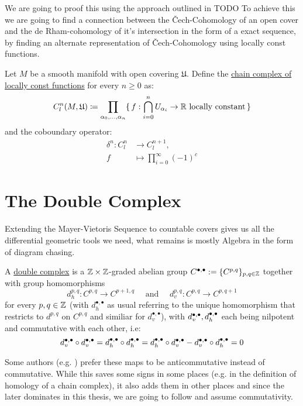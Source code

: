 We are going to proof this using the approach outlined in TODO
To achieve this we are going to find a connection between the Čech-Cohomology
of an open cover and the de Rham-cohomology of it's intersection in the form
of a exact sequence, by finding an alternate representation of Čech-Cohomology
using locally const functions.
\begin{definition}
Let $M$ be a smooth manifold with open covering $\mathfrak{U}$. Define
the \underline{chain complex of locally const functions} for every $n \geq 0$
as:
\[
	C^n_l(M, \mathfrak{U}) 
		\coloneq \prod_{\alpha_0, \dots, \alpha_n}
		\{\, f: \bigcap_{i = 0}^n U_{\alpha_i} \to \mathbb{R} \  \text{locally constant} \,\}
\]
and the coboundary operator:
\begin{align}
	\delta^n: C^n_l &\to C^{n + 1}_l, \\
	f &\mapsto \prod_{i = 0}^\infty (-1)^c
\end{align}
\end{definition}


\section{The Double Complex}
Extending the Mayer-Vietoris Sequence to countable covers gives us all the
differential geometric tools we need, what remains is mostly Algebra in the form
of diagram chasing.

\begin{definition}
	A \underline{double complex} is a $\mathbb{Z} \times \mathbb{Z}$-graded abelian group
	$C^{\bullet, \bullet} := \{C^{p,q}\}_{p,q \in \mathbb{Z}}$ together with group
	homomorphisms
	\[
		d^{p,q}_h: C^{p, q} \to C^{p + 1, q}
		\quad
		\text{ and }
		\quad
		d^{p,q}_v: C^{p,q} \to C^{p, q + 1}
	\]
	for every $p,q \in \mathbb{Z}$ (with $d^{\bullet, \bullet}_h$ as usual referring
	to the unique homomorphism that restricts to $d^{p,q}$ on $C^{p,q}$ and
	similiar for $d^{\bullet, \bullet}_v$),  with $d^{\bullet, \bullet}_v, d^{\bullet, \bullet}_h$ each being
	nilpotent and commutative with each other, i.e:
	\[
		d^{\bullet, \bullet}_v \circ d^{\bullet, \bullet}_v = d^{\bullet, \bullet}_h \circ d^{\bullet, \bullet}_h = d^{\bullet, \bullet}_h \circ d^{\bullet, \bullet}_v - d^{\bullet, \bullet}_v \circ d^{\bullet, \bullet}_h = 0
	\]
\end{definition}
\begin{remark}
	Some authors (e.g. \cite{weibel_introduction_1994}) prefer these maps to
	be anticommutative instead of commutative. While this saves some signs
	in some places (e.g. in the definition of homology of a chain complex),
	it also adds them in other places and since the later dominates in this
	thesis, we are going to follow \cite{tu_differential_1982} and assume
	commutativity.
\end{remark}

